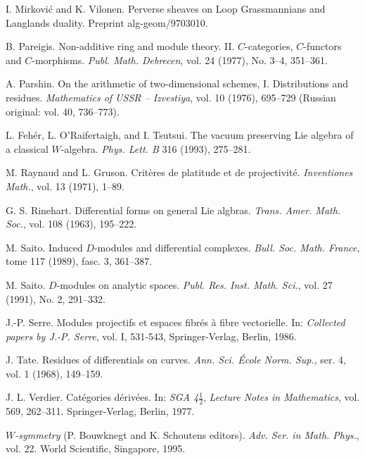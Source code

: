 \begin{description}[leftmargin=3.2em,itemsep=2pt]
\item[{[MV]}] I. Mirković and K. Vilonen. Perverse sheaves on Loop Grassmannians and Langlands duality. Preprint alg-geom/9703010.
\item[{[Pa]}] B. Pareigis. Non-additive ring and module theory. II. $C$-categories, $C$-functors and $C$-morphisms. \emph{Publ. Math. Debrecen}, vol. 24 (1977), No. 3--4, 351--361.
\item[{[Pa76]}] A. Parshin. On the arithmetic of two-dimensional schemes, I. Distributions and residues. \emph{Mathematics of USSR -- Izvestiya}, vol. 10 (1976), 695--729 (Russian original: vol. 40, 736--773).
\item[{[Phys]}] L. Fehér, L. O'Raifertaigh, and I. Tsutsui. The vacuum preserving Lie algebra of a classical $W$-algebra. \emph{Phys. Lett. B} 316 (1993), 275--281.
\item[{[RG]}] M. Raynaud and L. Gruson. Critères de platitude et de projectivité. \emph{Inventiones Math.}, vol. 13 (1971), 1--89.
\item[{[R]}] G. S. Rinehart. Differential forms on general Lie algbras. \emph{Trans. Amer. Math. Soc.}, vol. 108 (1963), 195--222.
\item[{[Sa89]}] M. Saito. Induced $D$-modules and differential complexes. \emph{Bull. Soc. Math. France}, tome 117 (1989), fasc. 3, 361--387.
\item[{[Sa91]}] M. Saito. $D$-modules on analytic spaces. \emph{Publ. Res. Inst. Math. Sci.}, vol. 27 (1991), No. 2, 291--332.
\item[{[Se]}] J.-P. Serre. Modules projectifs et espaces fibrés à fibre vectorielle. In: \emph{Collected papers by J.-P. Serre}, vol. I, 531-543, Springer-Verlag, Berlin, 1986.
\item[{[T]}] J. Tate. Residues of differentials on curves. \emph{Ann. Sci. École Norm. Sup.}, ser. 4, vol. 1 (1968), 149--159.
\item[{[Ve]}] J. L. Verdier. Catégories dérivées. In: \emph{SGA 4$\frac{1}{2}$}, \emph{Lecture Notes in Mathematics}, vol. 569, 262--311. Springer-Verlag, Berlin, 1977.
\item[{[W]}] \emph{$W$-symmetry} (P. Bouwknegt and K. Schoutens editors). \emph{Adv. Ser. in Math. Phys.}, vol. 22. World Scientific, Singapore, 1995.

\end{description}
